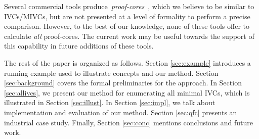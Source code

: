 Several commercial tools produce~\emph{proof-cores}~\cite{hanna2015formal, jasper_gold, Synopsys_VC_formal}, which we believe to be similar to IVCs/MIVCs, but are not presented at a level of formality to perform a precise comparison.  However, to the best of our knowledge, none of these tools offer to calculate \emph{all} proof-cores.  The current work may be useful towards the support of this capability in future additions of these tools.



The rest of the paper is organized as follows.
Section \ref{sec:example} introduces a running example used to illustrate concepts and our method.
Section \ref{sec:background} covers the formal preliminaries for the approach.
In Section \ref{sec:allivcs}, we present our method for enumerating all minimal IVCs,
which is illustrated in
Section \ref{sec:illust}. In Section \ref{sec:impl}, we talk about implementation and evaluation of our method. Section \ref{sec:qfc} presents an industrial case study. Finally, Section \ref{sec:conc} mentions conclusions and future work. 